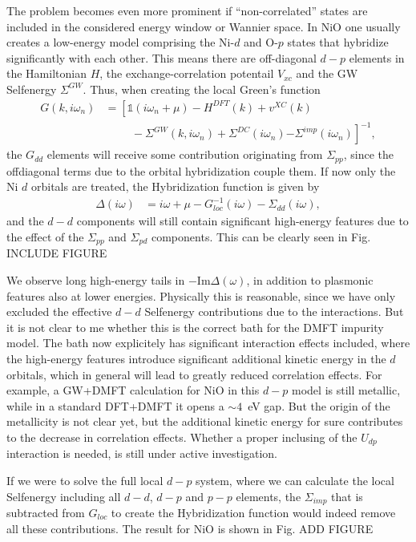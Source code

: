 \documentclass[12pt,a4paper]{scrartcl}
\numberwithin{equation}{section}
\newcommand{\cng}[1]{{\color{red}#1}}
\newcommand{\unity}{\mathds{1}}
\begin{document}
The problem becomes even more prominent if ``non-correlated'' states
are included in the considered energy window or Wannier space.
In NiO one usually creates a low-energy model comprising the Ni-$d$ and O-$p$
states that hybridize significantly with each other.
This means there are off-diagonal $d-p$ elements in the Hamiltonian $H$, 
the exchange-correlation potentail $V_{xc}$ and the 
GW Selfenergy $\Sigma^{GW}$.
Thus, when creating the local Green's function
\begin{align}
 G(k,i\omega_n) 
 &= \left[ \unity(i\omega_n+\mu ) -H^{DFT}(k) + v^{XC}(k) \right. \nonumber \\
          & \hspace{1cm}- \Sigma^{GW}(k,i\omega_n) 
          + \Sigma^{DC}(i\omega_n)
          \left. - \Sigma^{imp}(i\omega_n)
           \right]^{-1} ,
\end{align}
the $G_{dd}$ elements will receive some contribution originating 
from $\Sigma_{pp}$, since the offdiagonal terms due to the orbital
hybridization couple them.
If now only the Ni $d$ orbitals are treated, the Hybridization function
is given by
\begin{align}
\Delta(i\omega) 
&= i\omega + \mu - G_{loc}^{-1}(i\omega) - \Sigma_{dd}(i\omega),
\end{align}
and the $d-d$ components will still contain significant high-energy features
due to the effect of the $\Sigma_{pp}$ and $\Sigma_{pd}$
components. This can be clearly seen in Fig.
\cng{INCLUDE FIGURE}

We observe long high-energy tails in $-\mathrm{Im}\Delta(\omega)$,
in addition to plasmonic features also at lower energies. 
Physically this is reasonable, since we have only excluded the
effective $d-d$ Selfenergy contributions due to the interactions.
But it is not clear to me whether this is the correct
bath for the DMFT impurity model. The bath now explicitely
has significant interaction effects included, where the high-energy
features introduce significant additional kinetic energy
in the $d$ orbitals, which in general will lead to greatly reduced
correlation effects. For example,
a GW+DMFT calculation for NiO in this $d-p$ model is
still metallic, while in a standard DFT+DMFT 
it opens a $\sim 4$~eV gap. But the origin of the metallicity
is not clear yet, but the additional kinetic energy 
for sure contributes to the decrease in correlation effects.
Whether a proper inclusing of the $U_{dp}$ interaction
is needed, is still under active investigation. 

If we were to solve the full local $d-p$ system, where we
can calculate the local Selfenergy including all 
$d-d$, $d-p$ and $p-p$ elements, the $\Sigma_{imp}$ that is subtracted
from $G_{loc}$ to create the Hybridization function would indeed remove
all these contributions. The result for NiO is shown in Fig.
\cng{ADD FIGURE}
\end{document}

